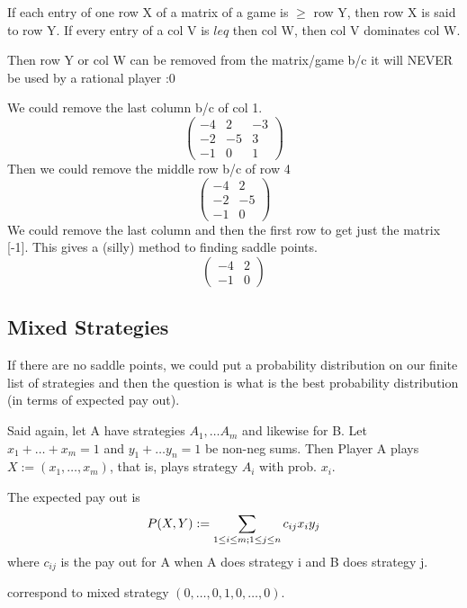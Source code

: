 \begin{definition}
If each entry of one row X of a matrix of a game is $\geq$ row Y, then row X is said to  row Y. If every entry of a col V is $leq$ then col W, then col V dominates col W.

Then row Y or col W can be removed from the matrix/game b/c it will NEVER be used by a rational player :0
\end{definition}

\begin{example}
We could remove the last column b/c of col 1.
\[\left(\begin{matrix}
-4 & 2 & -3\\
-2&-5&3\\
-1&0&1
\end{matrix}\right)\]
Then we could remove the middle row b/c of row 4
\[\left(\begin{matrix}
-4 & 2\\
-2&-5\\
-1&0
\end{matrix}\right)\]
We could remove the last column and then the first row to get just the matrix [-1]. This gives a (silly) method to finding saddle points.
\[\left(\begin{matrix}
-4 & 2\\
-1&0
\end{matrix}\right)\]
\end{example}




\subsection{Mixed Strategies}
If there are no saddle points, we could put a probability distribution on our finite list of strategies and then the question is what is the best probability distribution (in terms of expected pay out).

Said again, let A have strategies $A_1, \dots A_m$ and likewise for B. Let $x_1 + \dots + x_m = 1$ and $y_1 + \dots y_n = 1$ be non-neg sums. Then Player A plays  $X:=(x_1, \dots, x_m)$, that is, plays strategy $A_i$ with prob. $x_i$. 

The expected pay out is \[P(X,Y):= \sum_{1\leq i \leq m;  \\ 1 \leq j \leq n} c_{ij}x_iy_j\] where $c_{ij}$ is the pay out for A when A does strategy i and B does strategy j. 

 correspond to mixed strategy $(0, \dots, 0, 1, 0, \dots, 0)$.



